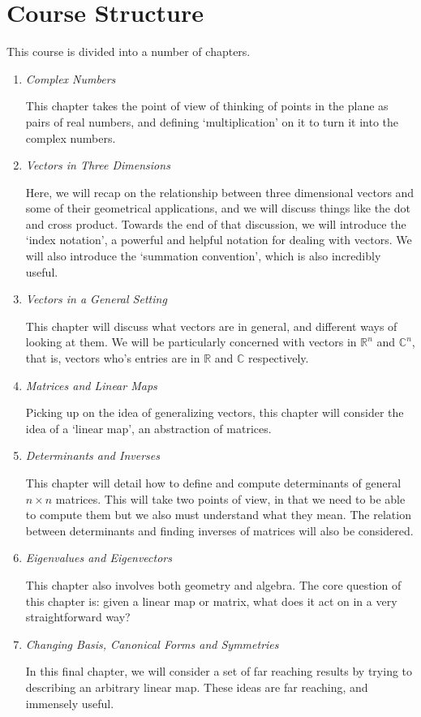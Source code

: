 \documentclass[a4]{scrreprt}
\begin{document}
\section{Course Structure}

This course is divided into a number of chapters.

\begin{enumerate}
	\item \emph{Complex Numbers}

	This chapter takes the point of view of thinking of points in the plane as pairs of real numbers, and defining `multiplication' on it to turn it into the complex numbers.

	\item \emph{Vectors in Three Dimensions}
	
	Here, we will recap on the relationship between three dimensional vectors and some of their geometrical applications, and we will discuss things like the dot and cross product. Towards the end of that discussion, we will introduce the `index notation', a powerful and helpful notation for dealing with vectors. We will also introduce the `summation convention', which is also incredibly useful.

	\item \emph{Vectors in a General Setting}
	
	This chapter will discuss what vectors are in general, and different ways of looking at them. We will be particularly concerned with vectors in $\mathbb{R}^n$ and $\mathbb{C}^n$, that is, vectors who's entries are in $\mathbb{R}$ and $\mathbb{C}$ respectively.

	\item \emph{Matrices and Linear Maps}
	
	Picking up on the idea of generalizing vectors, this chapter will consider the idea of a `linear map', an abstraction of matrices. 

	\item \emph{Determinants and Inverses}
	
	This chapter will detail how to define and compute determinants of general $n \times n$ matrices. This will take two points of view, in that we need to be able to compute them but we also must understand what they mean. The relation between determinants and finding inverses of matrices will also be considered.

	\item \emph{Eigenvalues and Eigenvectors}
	
	This chapter also involves both geometry and algebra. The core question of this chapter is: given a linear map or matrix, what does it act on in a very straightforward way?

	\item \emph{Changing Basis, Canonical Forms and Symmetries}
	
	In this final chapter, we will consider a set of far reaching results by trying to describing an arbitrary linear map. These ideas are far reaching, and immensely useful.
\end{enumerate}
\end{document}
